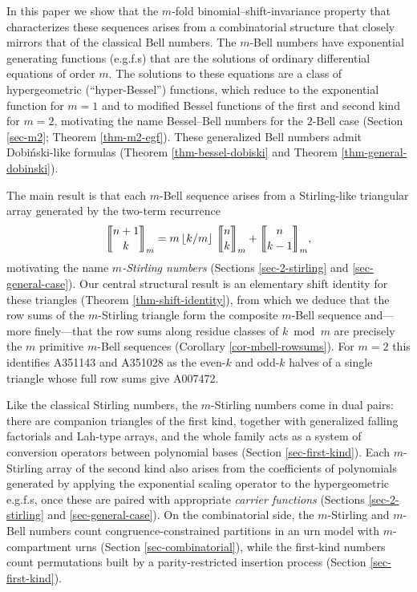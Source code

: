\documentclass[a4paper]{amsart}
\numberwithin{equation}{section}
\newcommand{\mStirling}[0]{\genfrac{\llbracket}{\rrbracket}{0pt}{}}
\newcommand{\floor}[1]{\left\lfloor #1 \right\rfloor}
\begin{document}
In this paper we show that the $m$-fold binomial--shift-invariance property that characterizes these sequences arises from a combinatorial structure that closely mirrors that of the classical Bell numbers. The $m$-Bell numbers have exponential generating functions (e.g.f.s) that are the solutions of ordinary differential equations of order $m$. The solutions to these equations are a class of hypergeometric (``hyper-Bessel'') functions, which reduce to the exponential function for $m=1$ and to modified Bessel functions of the first and second kind for $m=2$, motivating the name Bessel--Bell numbers for the $2$-Bell case (Section \ref{sec-m2}; Theorem \ref{thm-m2-egf}). These generalized Bell numbers admit Dobi\'nski-like formulas (Theorem \ref{thm-bessel-dobiski} and Theorem \ref{thm-general-dobinski}). 

The main result is that each $m$-Bell sequence arises from a Stirling-like triangular array generated by the two-term recurrence
%
\[
\mStirling{n+1}{k}_m = m\floor{k/m}\,\mStirling{n}{k}_m + \mStirling{n}{k-1}_m ,
\]
%
motivating the name \emph{$m$-Stirling numbers} (Sections \ref{sec-2-stirling} and \ref{sec-general-case}). Our central structural result is an elementary shift identity for these triangles (Theorem \ref{thm-shift-identity}), from which we deduce that the row sums of the $m$-Stirling triangle form the composite $m$-Bell sequence and---more finely---that the row sums along residue classes of $k \bmod m$ are precisely the $m$ primitive $m$-Bell sequences (Corollary \ref{cor-mbell-rowsums}). For $m = 2$ this identifies A351143 and A351028 as the even-$k$ and odd-$k$ halves of a single triangle whose full row sums give A007472.

Like the classical Stirling numbers, the $m$-Stirling numbers come in dual pairs: there are companion triangles of the first kind, together with generalized falling factorials and Lah-type arrays, and the whole family acts as a system of conversion operators between polynomial bases (Section \ref{sec-first-kind}). Each $m$-Stirling array of the second kind also arises from the coefficients of polynomials generated by applying the exponential scaling operator to the hypergeometric e.g.f.s, once these are paired with appropriate \emph{carrier functions} (Sections \ref{sec-2-stirling} and \ref{sec-general-case}). On the combinatorial side, the $m$-Stirling and $m$-Bell numbers count congruence-constrained partitions in an urn model with $m$-compartment urns (Section \ref{sec-combinatorial}), while the first-kind numbers count permutations built by a parity-restricted insertion process (Section \ref{sec-first-kind}). 
\end{document}
